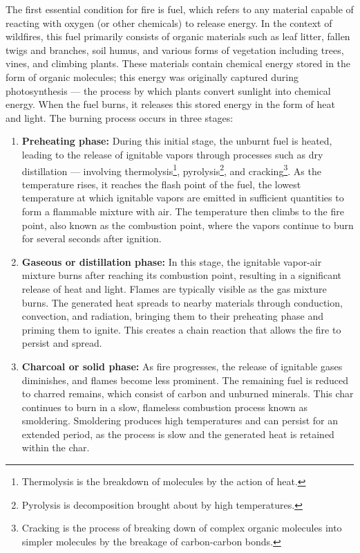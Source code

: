 \documentclass[
  12 pt,
]{Nemilov}
\begin{document}
The first essential condition for fire is fuel, which refers to any material capable of reacting with oxygen (or other chemicals) to release energy. In the context of wildfires, this fuel primarily consists of organic materials such as leaf litter, fallen twigs and branches, soil humus, and various forms of vegetation including trees, vines, and climbing plants. These materials contain chemical energy stored in the form of organic molecules; this energy was originally captured during photosynthesis --- the process by which plants convert sunlight into chemical energy. When the fuel burns, it releases this stored energy in the form of heat and light. The burning process occurs in three stages:

\begin{enumerate}
\def\labelenumi{\arabic{enumi}.}
\item
  \textbf{Preheating phase:} During this initial stage, the unburnt fuel is heated, leading to the release of ignitable vapors through processes such as dry distillation --- involving thermolysis\footnote{Thermolysis is the breakdown of molecules by the action of heat.}, pyrolysis\footnote{Pyrolysis is decomposition brought about by high temperatures.}, and cracking\footnote{Cracking is the process of breaking down of complex organic molecules into simpler molecules by the breakage of carbon-carbon bonds.}. As the temperature rises, it reaches the flash point of the fuel, the lowest temperature at which ignitable vapors are emitted in sufficient quantities to form a flammable mixture with air. The temperature then climbs to the fire point, also known as the combustion point, where the vapors continue to burn for several seconds after ignition.
\item
  \textbf{Gaseous or distillation phase:} In this stage, the ignitable vapor-air mixture burns after reaching its combustion point, resulting in a significant release of heat and light. Flames are typically visible as the gas mixture burns. The generated heat spreads to nearby materials through conduction, convection, and radiation, bringing them to their preheating phase and priming them to ignite. This creates a chain reaction that allows the fire to persist and spread.
\item
  \textbf{Charcoal or solid phase:} As fire progresses, the release of ignitable gases diminishes, and flames become less prominent. The remaining fuel is reduced to charred remains, which consist of carbon and unburned minerals. This char continues to burn in a slow, flameless combustion process known as smoldering. Smoldering produces high temperatures and can persist for an extended period, as the process is slow and the generated heat is retained within the char.
\end{enumerate}
\end{document}
